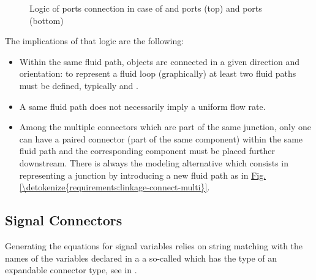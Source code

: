 \documentclass[letterpaper,10pt, openany,english]{sphinxmanual}
\begin{document}
\begin{figure}[htbp]
\centering
\capstart

\noindent{}
\caption{Logic of ports connection in case of  and  ports (top) and  ports (bottom)}\label{\detokenize{requirements:linkage-connect-junction}}\end{figure}

The implications of that logic are the following:
\begin{itemize}
\item {} 
Within the same fluid path, objects are connected in a given direction and orientation: to represent a fluid loop (graphically) at least two fluid paths must be defined, typically  and .

\item {} 
A same fluid path does not necessarily imply a uniform flow rate.

\item {} 
Among the multiple connectors which are part of the same junction, only one can have a paired  connector (part of the same component) within the same fluid path and the corresponding component must be placed further downstream. There is always the modeling alternative which consists in representing a junction by introducing a new fluid path as in \hyperref[\detokenize{requirements:linkage-connect-multi}]{Fig.\@ \ref{\detokenize{requirements:linkage-connect-multi}}}.

\end{itemize}


\subsection{Signal Connectors}
\label{\detokenize{requirements:signal-connectors}}
Generating the  equations for signal variables relies on string matching with the names of the variables declared in a a so-called  which has the type of an expandable connector type, see  in .
\end{document}
